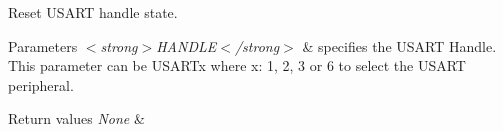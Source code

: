 Reset U\+S\+A\+RT handle state. 


\begin{DoxyParams}{Parameters}
{\em $<$strong$>$\+H\+A\+N\+D\+L\+E$<$/strong$>$} & specifies the U\+S\+A\+RT Handle. This parameter can be U\+S\+A\+R\+Tx where x\+: 1, 2, 3 or 6 to select the U\+S\+A\+RT peripheral. \\
\hline
\end{DoxyParams}

\begin{DoxyRetVals}{Return values}
{\em None} & \\
\hline
\end{DoxyRetVals}
